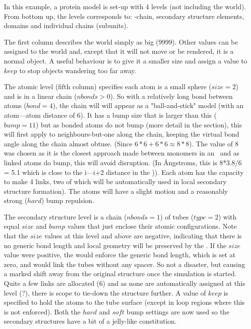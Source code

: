 In this example, a protein model is set-up with 4 levels (not including the world).
From bottom up, the levels corresponds to: \CA-chain, secondary structure elements,
domains and individual chains (subunits). 

The first column describes the world simply as big (9999).  Other values can be assigned to
the world and, except that it will not move or be rendered, it is a normal object.
A useful behaviour is to give it a smaller size and assign a value to $keep$ to stop
objects wandering too far away. 

The atomic level (fifth column) specifies each atom is a small sphere ($size = 2$) and is in
a linear chain ($nbonds > 0$).  So with a relatively long bond between atoms ($bond = 4$),
the chain will will appear as a "ball-and-stick" model (with an atom---atom distance of 6). 
It has a bump size that is larger than this ($bump = 11$) but as bonded atoms do not bump (more
detail in the  section), this will first apply to neighbours-but-one along the chain,
keeping the virtual bond angle along the chain almost obtuse. (Since $6*6+6*6 \approx 8*8$).
The value of 8 was chosen as it is the closest approach made between monomers in an \AH\ and
as linked atoms do bump, this will avoid disruption. (In \AA ngstroms, this is 8*3.8/6 = 5.1
which is close to the i---i+2 distance in the \AH)). 
Each atom has the capacity to make 4 links, two of which will be automatically used in local
secondary structure formation).  The atoms will have a slight motion and a reasonably strong
($hard$) bump repulsion.

The secondary structure level is a chain ($nbonds = 1$) of tubes ($type = 2$) with equal
$size$ and $bump$ values that just enclose their atomic configurations. Note that the $size$
values at this level and above are negative, indicating that there is no generic bond length 
and local geometry will be preserved by the .   If the $size$ value were positive,
the  would enforce the generic bond length, which is set at zero, and would link
the tubes without any spacer.  So not a disaster, but causing a marked shift away from
the original structure once the simulation is started.  Quite a few links are allocated (6)
and as none are automatically assigned at this level (?), there is scope to tie-down the 
structure further.  A value of $keep$ is specified to hold the atoms to the tube surface
(except in loop regions where this is not enforced).
Both the $hard$ and $soft$ bump settings are now used so the secondary
structures have a bit of a jelly-like constitution.

